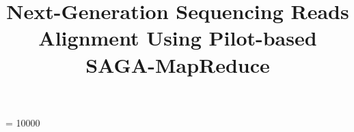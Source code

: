 \documentclass{sig-alternate}
\begin{document}
 {}
\widowpenalty = 10000



\newif\ifdraft
\drafttrue                                                                                                   

\ifdraft
 \newcommand{\jkimnote}[1]{{\textcolor{green}   { ***Joohyun:   #1 }}}
 \newcommand{\jhanote}[1]{  {\textcolor{red}     { ***SJ: #1 }}}
  \newcommand{\pmnote}[1]{  {\textcolor{red}     { ***Pradeep: #1 }}}
 \newcommand{\todo}[1]{  {\textcolor{red}     { ***TODO: #1 }}}
 \newcommand{\fix}[1]{  {\textcolor{red}     { ***FIX: #1 }}}
 \newcommand{\reviewer}[1]{}
\else
 \newcommand{\reviewer}[1]{}
 \newcommand{\jkimnote}[1]{}
 \newcommand{\pmnote}[1]{}
 \newcommand{\jhanote}[1]{}
 \newcommand{\todo}[1]{  {\textcolor{red}     { ***TODO: #1 }}}
 \newcommand{\fix}[1]{}                                                                                     
\fi

\title{Next-Generation Sequencing Reads Alignment Using Pilot-based SAGA-MapReduce}
\end{document}
